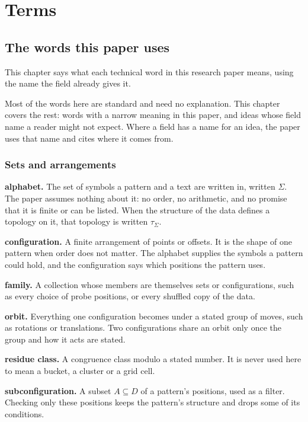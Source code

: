 \chapter{Terms}

\section{The words this paper uses}

This chapter says what each technical word in this research paper means, using the name the field already gives it.

Most of the words here are standard and need no explanation. This chapter covers the rest: words with a narrow meaning in this paper, and ideas whose field name a reader might not expect. Where a field has a name for an idea, the paper uses that name and cites where it comes from.

\subsection{Sets and arrangements}

\noindent\textbf{alphabet.} The set of symbols a pattern and a text are written in, written \(\Sigma\). The paper assumes nothing about it: no order, no arithmetic, and no promise that it is finite or can be listed. When the structure of the data defines a topology on it, that topology is written \(\tau_\Sigma\).

\noindent\textbf{configuration.} A finite arrangement of points or offsets. It is the shape of one pattern when order does not matter. The alphabet supplies the symbols a pattern could hold, and the configuration says which positions the pattern uses.

\noindent\textbf{family.} A collection whose members are themselves sets or configurations, such as every choice of probe positions, or every shuffled copy of the data.

\noindent\textbf{orbit.} Everything one configuration becomes under a stated group of moves, such as rotations or translations. Two configurations share an orbit only once the group and how it acts are stated.

\noindent\textbf{residue class.} A congruence class modulo a stated number. It is never used here to mean a bucket, a cluster or a grid cell.

\noindent\textbf{subconfiguration.} A subset \(A \subseteq D\) of a pattern's positions, used as a filter. Checking only these positions keeps the pattern's structure and drops some of its conditions.

